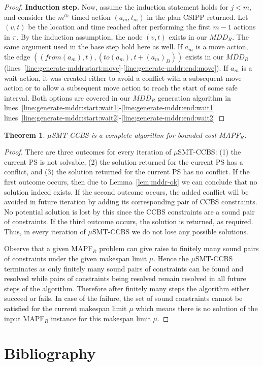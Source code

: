 \documentclass[review]{elsarticle}
\newtheorem{theorem}{Theorem}
\newcommand{\mddr}{\ensuremath{MDD_R}\xspace}
\newcommand{\fromv}{\ensuremath{\mathit{from}}\xspace}
\newcommand{\tov}{\ensuremath{\mathit{to}}\xspace}
\newcommand{\ccbs}{\ac{CCBS}\xspace}
\newcommand{\csipp}{\ac{CSIPP}\xspace}
\newcommand{\ps}{\ac{PS}\xspace}
\newcommand{\mapfr}{\ac{MAPF}$_R$\xspace}
\newcommand{\musmtccbs}{\ensuremath{\mu}SMT-CCBS\xspace}
\newcommand{\mapf}{\ac{MAPF}\xspace}
\begin{document}
\begin{proof}
\textbf{Induction step.}
Now, assume the induction statement holds for $j<m$, and consider the $m^{th}$ timed action $(a_m, t_m)$ in the plan \csipp returned. 
Let $(v,t)$ be the location and time reached after performing the first $m-1$ actions in $\pi$. 
By the induction assumption, the node $(v,t)$ exists in our \mddr. 
The same argument used in the base step hold here as well. 
If $a_m$ is a move action, the edge $((\fromv(a_m), t),(\tov(a_m),t+(a_m)_D))$ exists in our \mddr (lines~\ref{line:generate-mddr:start:move}-\ref{line:generate-mddr:end:move}). 
If $a_m$ is a wait action, it was created either to avoid a conflict with a subsequent move action or to allow a subsequent move action to reach the start of some safe interval.  
Both options are covered in our \mddr generation algorithm in 
lines~\ref{line:generate-mddr:start:wait1}-\ref{line:generate-mddr:end:wait1}
lines~\ref{line:generate-mddr:start:wait2}-\ref{line:generate-mddr:end:wait2}
\end{proof}


\begin{theorem}
	\musmtccbs is a complete algorithm for bounded-cost \mapfr. 
	\label{the:bounded-cost-makespan}
\end{theorem}
\begin{proof}
	There are three outcomes for every iteration of \musmtccbs: (1) the current \ps is not solvable, (2) the solution returned for the current \ps has a conflict, 
	and (3) the solution returned for the current \ps has no conflict. 
	If the first outcome occurs, then due to Lemma~\ref{lem:mddr-ok} we can conclude that no solution indeed exists. 
	If the second outcome occurs, the added conflict 
	will be avoided in future iteration by adding its corresponding pair of \ccbs constraints. 
	No potential solution is lost by this since the \ccbs constraints are a sound pair of constraints. 
	If the third outcome occurs, the solution is returned, as required. 
	Thus, in every iteration of \musmtccbs we do not lose any possible solutions. 
	
	
	Observe that a given \mapfr problem  can give raise to finitely many sound pairs of constraints under the given makespan limit $\mu$. Hence the \musmtccbs terminates as only finitely many sound pairs of constraints can be found and resolved while pairs of constraints being resolved remain resolved in all future steps of the algorithm. Therefore after finitely many steps the algorithm either succeed or fails. In case of the failure, the set of sound constraints cannot be satisfied for the current makespan limit $\mu$ which means there is no solution of the input \mapfr instance for this makespan limit $\mu$.
\end{proof}


%
\section*{Bibliography}




\end{document}
